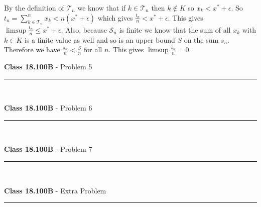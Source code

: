 \documentclass[11pt,reqno]{article}
\begin{document}
\indent By the definition of $\mathcal{T}_n$ we know that if $k \in \mathcal{T}_n$ then $k \notin K$ so $x_k < x^* + \epsilon$. So $t_ n = \sum_{k \in \mathcal{T}_n}^n x_k < n(x^* + \epsilon)$ 
which gives $\frac{t_n}{n} < x^* + \epsilon$. This gives $\limsup \frac{t_n}{n} \le x^* + \epsilon$. Also, because $\mathcal{S}_n$ is finite we know that the sum of all $x_k$ with $k \in K$ is a finite value as well and so is an upper bound $S$ on the sum $s_n$. Therefore we have $\frac{s_n}{n} < \frac{S}{n}$ for all $n$. This gives $\limsup \frac{s_n}{n} = 0$.

\vspace{15pt}
\begin{flushleft} 
\textbf{Class 18.100B} - Problem 5\\
\rule{500pt}{1pt}\\
\end{flushleft} 


\vspace{15pt}
\begin{flushleft} 
\textbf{Class 18.100B} - Problem 6\\
\rule{500pt}{1pt}\\
\end{flushleft} 


\vspace{15pt}
\begin{flushleft} 
\textbf{Class 18.100B} - Problem 7\\
\rule{500pt}{1pt}\\
\end{flushleft} 


\vspace{15pt}
\begin{flushleft} 
\textbf{Class 18.100B} - Extra Problem \\
\rule{500pt}{1pt}\\
\end{flushleft} 
\end{document}
